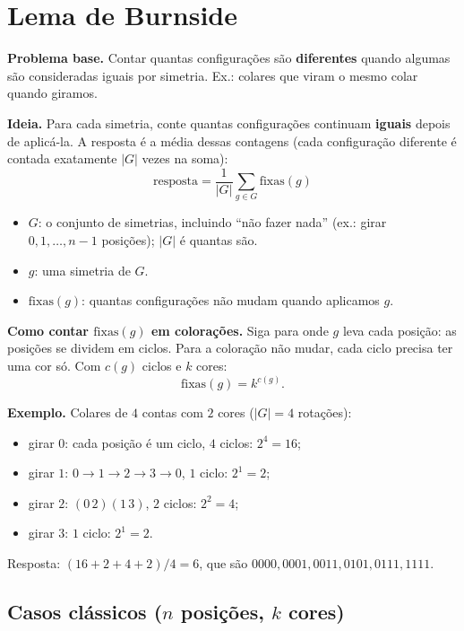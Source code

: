 \section{Lema de Burnside}

\textbf{Problema base.} Contar quantas configurações são \textbf{diferentes} quando algumas são consideradas
iguais por simetria. Ex.: colares que viram o mesmo colar quando giramos.

\textbf{Ideia.} Para cada simetria, conte quantas configurações continuam \textbf{iguais} depois de aplicá-la.
A resposta é a média dessas contagens (cada configuração diferente é contada exatamente $|G|$ vezes na soma):
\[
\boxed{\text{resposta} = \frac{1}{|G|} \sum_{g \in G} \mathrm{fixas}(g)}
\]
\begin{itemize}
  \item $G$: o conjunto de simetrias, incluindo ``não fazer nada'' (ex.: girar $0, 1, \dots, n-1$ posições); $|G|$ é quantas são.
  \item $g$: uma simetria de $G$.
  \item $\mathrm{fixas}(g)$: quantas configurações não mudam quando aplicamos $g$.
\end{itemize}

\textbf{Como contar $\mathrm{fixas}(g)$ em colorações.} Siga para onde $g$ leva cada posição: as posições
se dividem em ciclos. Para a coloração não mudar, cada ciclo precisa ter uma cor só. Com $c(g)$ ciclos e $k$ cores:
\[ \mathrm{fixas}(g) = k^{c(g)}. \]

\textbf{Exemplo.} Colares de $4$ contas com $2$ cores ($|G| = 4$ rotações):
\begin{itemize}
  \item girar $0$: cada posição é um ciclo, $4$ ciclos: $2^4 = 16$;
  \item girar $1$: $0 \to 1 \to 2 \to 3 \to 0$, $1$ ciclo: $2^1 = 2$;
  \item girar $2$: $(0\,2)(1\,3)$, $2$ ciclos: $2^2 = 4$;
  \item girar $3$: $1$ ciclo: $2^1 = 2$.
\end{itemize}
Resposta: $(16 + 2 + 4 + 2)/4 = 6$, que são $0000, 0001, 0011, 0101, 0111, 1111$.

\subsection*{Casos clássicos ($n$ posições, $k$ cores)}

